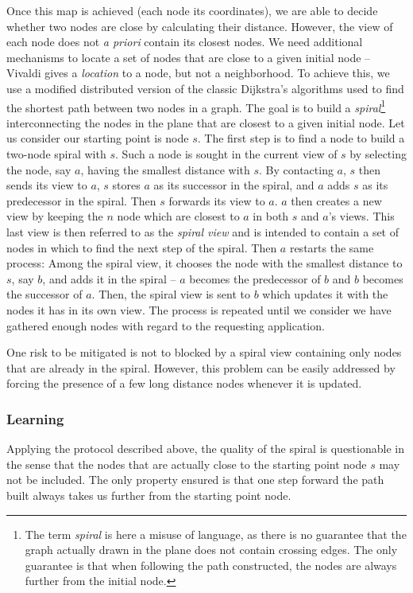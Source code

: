 Once this map is achieved (each node its coordinates), we are able to decide
whether two nodes are close by calculating their distance. However, the view of
each node does not \emph{a priori} contain its closest nodes. We need additional
mechanisms to locate a set of nodes that are close to a given initial node --
Vivaldi gives a \emph{location} to a node, but not a neighborhood. To achieve
this, we use a modified distributed version of the classic Dijkstra's algorithms
used to find the shortest path between two nodes in a graph. The goal is to
build a \emph{spiral}\footnote{The term \emph{spiral} is here a misuse of
language, as there is no guarantee that the graph actually drawn in the plane
does not contain crossing edges. The only guarantee is that when following the
path constructed, the nodes are always further from the initial node.}
interconnecting the nodes in the plane that are closest to a given initial
node. Let us consider our starting point is node $s$. The first step is to find
a node to build a two-node spiral with $s$. Such a node is sought in the current
view of $s$ by selecting the node, say $a$, having the smallest distance with
$s$. By contacting $a$, $s$ then sends its view to $a$, $s$ stores $a$ as its
successor in the spiral, and $a$ adds $s$ as its predecessor in the spiral. Then
$s$ forwards its view to $a$. $a$ then creates a new view by keeping the $n$
node which are closest to $a$ in both $s$ and $a$'s views. This last view is
then referred to as the \emph{spiral view} and is intended to contain a set of
nodes in which to find the next step of the spiral. Then $a$ restarts the same
process: Among the spiral view, it chooses the node with the smallest distance
to $s$, say $b$, and adds it in the spiral -- $a$ becomes the predecessor of $b$
and $b$ becomes the successor of $a$. Then, the spiral view is sent to $b$ which
updates it with the nodes it has in its own view. The process is repeated until
we consider we have gathered enough nodes with regard to the requesting
application.

One risk to be mitigated is not to blocked by a spiral view containing only
nodes that are already in the spiral. However, this problem can be easily
addressed by forcing the presence of a few long distance nodes whenever it is
updated.

\subsubsection*{Learning}

Applying the protocol described above, the quality of the spiral is
questionable in the sense that the nodes that are actually close to the starting
point node $s$ may not be included. The only property ensured is that one step
forward the path built always takes us further from the starting point node.


